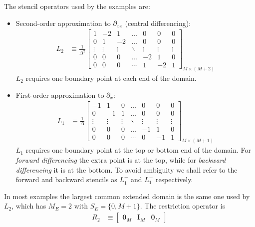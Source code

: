 \documentclass[11pt]{article}
\newcommand{\D}[1][]{\ensuremath{\partial_{#1}}}
\begin{document}
The stencil operators used by the examples are:
\begin{itemize}
	\item Second-order approximation to $\D[xx]$ (central differencing):
	\begin{align}
		L_2 &\equiv \frac{1}{\Delta^2}\begin{bmatrix}
		1&-2&1&\dots&0&0&0\\
		0&1&-2&\dots&0&0&0\\
		\vdots&\vdots&\vdots&\ddots&\vdots&\vdots&\vdots\\
		0&0&0&\dots&-2&1&0\\
		0&0&0&\cdots&1&-2&1
		\end{bmatrix}_{M\times(M+2)}\label{eq:L-2}
	\end{align}
	$L_2$ requires one boundary point at each end of the domain.

	\item First-order approximation to $\D[x]$:
	\begin{align}
		L_1 &\equiv \frac{1}{\Delta}\begin{bmatrix}
		-1&1&0&\dots&0&0&0\\
		0&-1&1&\dots&0&0&0\\
		\vdots&\vdots&\vdots&\ddots&\vdots&\vdots&\vdots\\
		0&0&0&\dots&-1&1&0\\
		0&0&0&\cdots&0&-1&1
		\end{bmatrix}_{M\times(M+1)}\label{eq:L-1}
	\end{align}
	$L_1$ requires one boundary point at the top or bottom end of the domain. For \textit{forward differencing} the extra point is at the top, while for \textit{backward differencing} it is at the bottom. To avoid ambiguity we shall refer to the forward and backward stencils as $L^+_1$ and $L^-_1$ respectively.
\end{itemize}

In most examples the largest common extended domain is the same one used by $L_2$, which has $M_E = 2$ with $S_E = \{0, M+1\}$. The restriction operator is
\begin{align}
	R_2 &\equiv \begin{bmatrix} \mathbf{0}_M & \mathbf{I}_M & \mathbf{0}_M\end{bmatrix}\label{eq:R-2}
\end{align}
\end{document}
